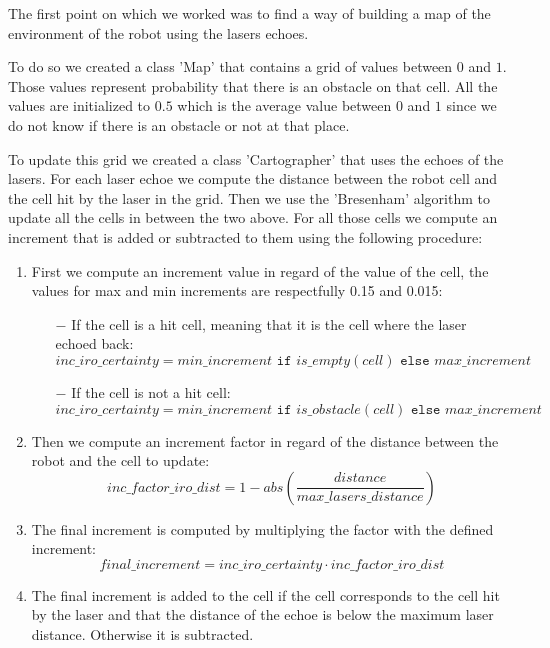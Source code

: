 The first point on which we worked was to find a way of building a map of the environment of the robot using the lasers echoes.

To do so we created a class 'Map' that contains a grid of values between $0$ and $1$.
Those values represent probability that there is an obstacle on that cell.
All the values are initialized to $0.5$ which is the average value between $0$ and $1$ since we do not know if there is an obstacle or not at that place.

To update this grid we created a class 'Cartographer' that uses the echoes of the lasers.
For each laser echoe we compute the distance between the robot cell and the cell hit by the laser in the grid.
Then we use the 'Bresenham' algorithm to update all the cells in between the two above.
For all those cells we compute an increment that is added or subtracted to them using the following procedure:

\begin{enumerate}
    \item First we compute an increment value in regard of the value of the cell, the values for max and min increments are respectfully 0.15 and 0.015:
        \begin{itemize}
            \item[$-$] If the cell is a hit cell, meaning that it is the cell where the laser echoed back:
            $$
                inc\_iro\_certainty = min\_increment\texttt{ if }is\_empty(cell)\texttt{ else }max\_increment
            $$
            \item[$-$] If the cell is not a hit cell:
            $$
                inc\_iro\_certainty = min\_increment\texttt{ if }is\_obstacle(cell)\texttt{ else }max\_increment
            $$
        \end{itemize}
    \item Then we compute an increment factor in regard of the distance between the robot and the cell to update:
        $$
        inc\_factor\_iro\_dist = 1 - abs(\dfrac{distance}{max\_lasers\_distance})
        $$
    \item The final increment is computed by multiplying the factor with the defined increment:
        $$
        final\_increment = inc\_iro\_certainty \cdot inc\_factor\_iro\_dist
        $$
    \item The final increment is added to the cell if the cell corresponds to the cell hit by the laser and that the distance of the echoe is below the maximum laser distance.
        Otherwise it is subtracted.
\end{enumerate}

